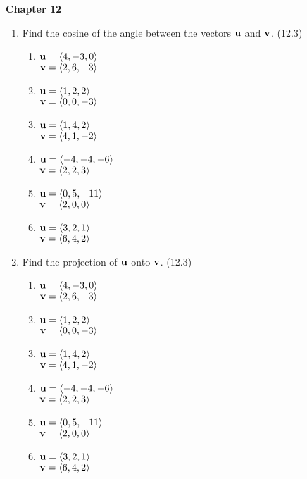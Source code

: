 \newcommand{\thetitle}{
  Stewart's Calculus Chapter 12-16 | Study Problems
}





\centerline{\bf Chapter 12}

  \begin{enumerate}


    \item Find the cosine of the angle between the vectors $\mathbf{u}$ and $\mathbf{v}$. (12.3)

      \begin{enumerate}
        \item $\mathbf{u}=\left<4,-3,0\right>$\\ $\mathbf{v}=\left<2,6,-3\right>$
        \item $\mathbf{u}=\left<1,2,2\right>$\\ $\mathbf{v}=\left<0,0,-3\right>$
        \item $\mathbf{u}=\left<1,4,2\right>$\\ $\mathbf{v}=\left<4,1,-2\right>$
        \item $\mathbf{u}=\left<-4,-4,-6\right>$\\ $\mathbf{v}=\left<2,2,3\right>$
        \item $\mathbf{u}=\left<0,5,-11\right>$\\ $\mathbf{v}=\left<2,0,0\right>$
        \item $\mathbf{u}=\left<3,2,1\right>$\\ $\mathbf{v}=\left<6,4,2\right>$
      \end{enumerate}

    \item Find the projection of $\mathbf{u}$ onto $\mathbf{v}$. (12.3) %

      \begin{enumerate}
        \item $\mathbf{u}=\left<4,-3,0\right>$\\ $\mathbf{v}=\left<2,6,-3\right>$
        \item $\mathbf{u}=\left<1,2,2\right>$\\ $\mathbf{v}=\left<0,0,-3\right>$
        \item $\mathbf{u}=\left<1,4,2\right>$\\ $\mathbf{v}=\left<4,1,-2\right>$
        \item $\mathbf{u}=\left<-4,-4,-6\right>$\\ $\mathbf{v}=\left<2,2,3\right>$
        \item $\mathbf{u}=\left<0,5,-11\right>$\\ $\mathbf{v}=\left<2,0,0\right>$
        \item $\mathbf{u}=\left<3,2,1\right>$\\ $\mathbf{v}=\left<6,4,2\right>$
      \end{enumerate}


\end{enumerate}
